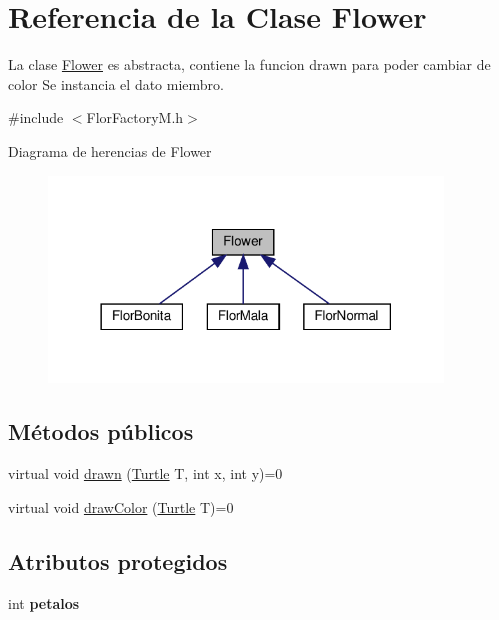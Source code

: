 \hypertarget{classFlower}{}\section{Referencia de la Clase Flower}
\label{classFlower}


La clase \hyperlink{classFlower}{Flower} es abstracta, contiene la funcion drawn para poder cambiar de color  Se instancia el dato miembro.  




{\ttfamily \#include $<$Flor\+Factory\+M.\+h$>$}



Diagrama de herencias de Flower
\nopagebreak
\begin{figure}[H]
\begin{center}
\leavevmode
\includegraphics[width=297pt]{classFlower__inherit__graph}
\end{center}
\end{figure}
\subsection*{Métodos públicos}
\begin{DoxyCompactItemize}
\item 
virtual void \hyperlink{classFlower_af01eea570f9d02e16cda1d86ee97633c}{drawn} (\hyperlink{classTurtle}{Turtle} T, int x, int y)=0
\item 
virtual void \hyperlink{classFlower_a23dd402c7227bf81c42d7e57772c15bf}{draw\+Color} (\hyperlink{classTurtle}{Turtle} T)=0
\end{DoxyCompactItemize}
\subsection*{Atributos protegidos}
\begin{DoxyCompactItemize}
\item 
\mbox{\label{classFlower_a219dc895fadc1d1c8850d205cae4f9a2}} 
int {\bfseries petalos}
\end{DoxyCompactItemize}



